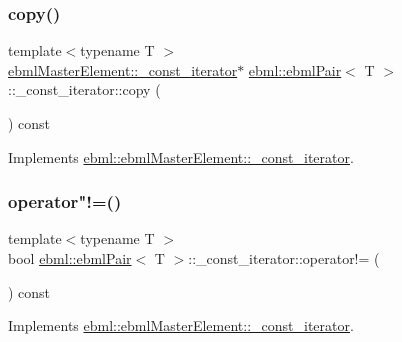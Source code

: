 \subsubsection{\texorpdfstring{copy()}{copy()}}
{\footnotesize\ttfamily template$<$typename T $>$ \\
\mbox{\hyperlink{classebml_1_1ebmlMasterElement_1_1__const__iterator}{ebml\+Master\+Element\+::\+\_\+const\+\_\+iterator}}$\ast$ \mbox{\hyperlink{classebml_1_1ebmlPair}{ebml\+::ebml\+Pair}}$<$ T $>$\+::\+\_\+const\+\_\+iterator\+::copy (\begin{DoxyParamCaption}{ }\end{DoxyParamCaption}) const\hspace{0.3cm}{\ttfamily [virtual]}}



Implements \mbox{\hyperlink{classebml_1_1ebmlMasterElement_1_1__const__iterator_a64a4853ad363358987eb6492579cd503}{ebml\+::ebml\+Master\+Element\+::\+\_\+const\+\_\+iterator}}.

\mbox{\label{classebml_1_1ebmlPair_1_1__const__iterator_ae764d0a947293d8383d98c3105ce2fa7}} 
\subsubsection{\texorpdfstring{operator"!=()}{operator!=()}}
{\footnotesize\ttfamily template$<$typename T $>$ \\
bool \mbox{\hyperlink{classebml_1_1ebmlPair}{ebml\+::ebml\+Pair}}$<$ T $>$\+::\+\_\+const\+\_\+iterator\+::operator!= (\begin{DoxyParamCaption}\item[{const \mbox{\hyperlink{classebml_1_1ebmlMasterElement_1_1__const__iterator}{ebml\+Master\+Element\+::\+\_\+const\+\_\+iterator}} \&}]{ }\end{DoxyParamCaption}) const\hspace{0.3cm}{\ttfamily [virtual]}}



Implements \mbox{\hyperlink{classebml_1_1ebmlMasterElement_1_1__const__iterator_ac62d190e9da49236835f8219ec307d22}{ebml\+::ebml\+Master\+Element\+::\+\_\+const\+\_\+iterator}}.


